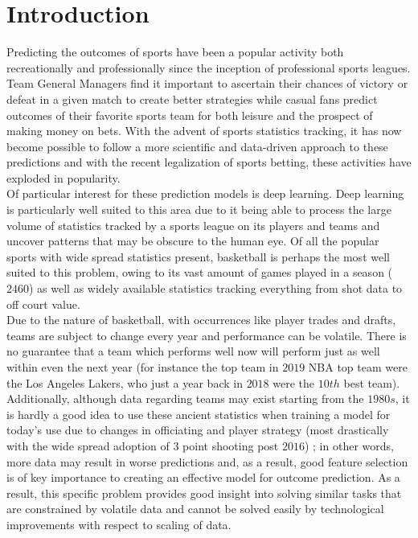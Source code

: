 \documentclass[10pt,twocolumn,letterpaper]{article}
\begin{document}
\section{Introduction}
\label{sec:intro}

Predicting the outcomes of sports have been a popular activity both recreationally and professionally since the inception of professional sports leagues. Team General Managers find it important to ascertain their chances of victory or defeat in a given match to create better strategies while casual fans predict outcomes of their favorite sports team for both leisure and the prospect of making money on bets. With the advent of sports statistics tracking, it has now become possible to follow a more scientific and data-driven approach to these predictions and with the recent legalization of sports betting, these activities have exploded in popularity. \\

Of particular interest for these prediction models is deep learning. Deep learning is particularly well suited to this area due to it being able to process the large volume of statistics tracked by a sports league on its players and teams and uncover patterns that may be obscure to the human eye. Of all the popular sports with wide spread statistics present, basketball is perhaps the most well suited to this problem, owing to its vast amount of games played in a season ($2460$) as well as widely available statistics tracking everything from shot data to off court value. \\ 

Due to the nature of basketball, with occurrences like player trades and drafts, teams are subject to change every year and performance can be volatile. There is no guarantee that a team which performs well now will perform just as well within even the next year (for instance the top team in $2019$ NBA top team were the Los Angeles Lakers, who just a year back in $2018$ were the $10th$ best team). Additionally, although data regarding teams may exist starting from the $1980s$, it is hardly a good idea to use these ancient statistics when training a model for today's use due to changes in officiating and player strategy (most drastically with the wide spread adoption of $3$ point shooting post $2016$) \cite{BBR}; in other words, more data may result in worse predictions and, as a result, good feature selection is of key importance to creating an effective model for outcome prediction. As a result, this specific problem provides good insight into solving similar tasks that are constrained by volatile data and cannot be solved easily by technological improvements with respect to scaling of data. \\
\end{document}
